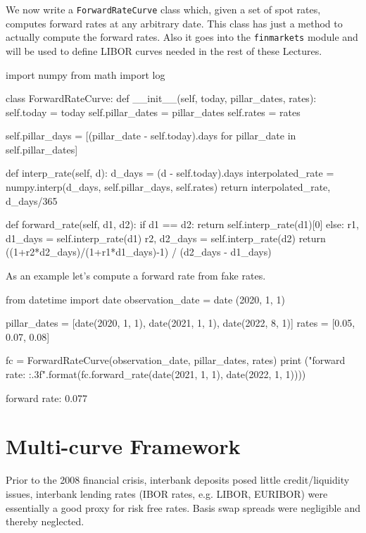 \begin{finmarkets}
We now write a \texttt{ForwardRateCurve} class which, given a set of spot rates, computes forward rates at any arbitrary date. This class has just a method to actually compute the forward rates. Also it goes into the \texttt{finmarkets} module and will be used to define LIBOR curves needed in the rest of these Lectures.
\end{finmarkets}

\begin{ipython}
import numpy
from math import log

class ForwardRateCurve:
    def __init__(self, today, pillar_dates, rates):
        self.today = today
        self.pillar_dates = pillar_dates
        self.rates = rates

        self.pillar_days = [(pillar_date - self.today).days
            for pillar_date in self.pillar_dates]        

    def interp_rate(self, d):
        d_days = (d - self.today).days
        interpolated_rate = numpy.interp(d_days, self.pillar_days, self.rates)
        return interpolated_rate, d_days/365

    def forward_rate(self, d1, d2):
        if d1 == d2:
            return self.interp_rate(d1)[0]
        else:
            r1, d1_days = self.interp_rate(d1)
            r2, d2_days = self.interp_rate(d2)
            return ((1+r2*d2_days)/(1+r1*d1_days)-1) / (d2_days - d1_days)
\end{ipython}

As an example let's compute a forward rate from fake rates.
\begin{ipython}
from datetime import date
observation_date = date (2020, 1, 1)

pillar_dates = [date(2020, 1, 1), 
date(2021, 1, 1), 
date(2022, 8, 1)]
rates = [0.05, 0.07, 0.08]

fc = ForwardRateCurve(observation_date, pillar_dates, rates)
print ("forward rate: {:.3f}".format(fc.forward_rate(date(2021, 1, 1), date(2022, 1, 1))))
\end{ipython}
\begin{solution}
forward rate: 0.077
\end{solution}

\section{Multi-curve Framework}
\label{sec:financial-crisis}

Prior to the 2008 financial crisis, interbank deposits posed little credit/liquidity issues, interbank lending rates (IBOR rates, e.g. LIBOR, EURIBOR) were essentially a good proxy for risk free rates. Basis swap spreads were negligible and thereby neglected. 

